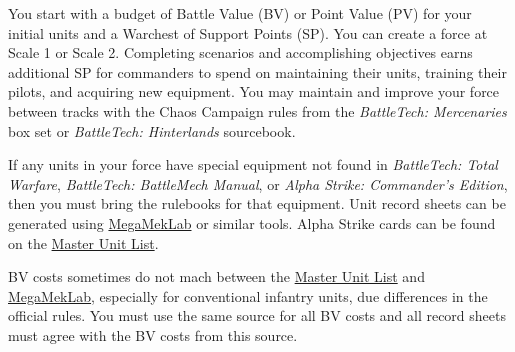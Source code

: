 You start with a budget of Battle Value (BV) or Point Value (PV) for your initial units and a Warchest of Support Points (SP).
You can create a force at Scale 1 or Scale 2.
Completing scenarios and accomplishing objectives earns additional SP for commanders to spend on maintaining their units, training their pilots, and acquiring new equipment.
You may maintain and improve your force between tracks with the Chaos Campaign rules from the \emph{BattleTech: Mercenaries} box set or \emph{BattleTech: Hinterlands} sourcebook.

If any units in your force have special equipment not found in \emph{BattleTech: Total Warfare}, \emph{BattleTech: BattleMech Manual}, or \emph{Alpha Strike: Commander's Edition}, then you must bring the rulebooks for that equipment.
Unit record sheets can be generated using \href{https://megamek.org}{MegaMekLab} or similar tools.
Alpha Strike cards can be found on the \href{http://www.masterunitlist.info}{Master Unit List}.

BV costs sometimes do not mach between the \href{http://www.masterunitlist.info}{Master Unit List} and \href{https://megamek.org}{MegaMekLab}, especially for conventional infantry units, due differences in the official rules.
You must use the same source for all BV costs and all record sheets must agree with the BV costs from this source.
